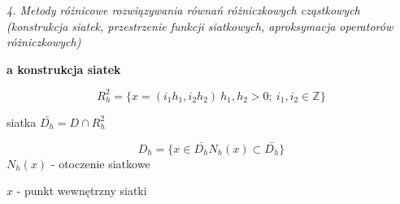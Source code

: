 \textit{4. Metody różnicowe rozwiązywania równań różniczkowych cząstkowych (konstrukcja siatek, przestrzenie funkcji siatkowych, aproksymacja operatorów różniczkowych)}

\textbf{a\) konstrukcja siatek}

\[R^{2}_{h} = \{ x = (i_{1}h_{1}, i_{2}h_{2})\ h_{1},h_{2} > 0;\ i_{1},i_{2} \in \mathbb{Z}\}\]

siatka $\bar{D_{h}} = D \cap R^{2}_{h}$

\[D_{h} = \{ x \in \bar{D_{h}} N_h(x) \subset \bar{D_{h}}\}\]
$N_h(x)$ - otoczenie siatkowe

$x$ - punkt wewnętrzny siatki